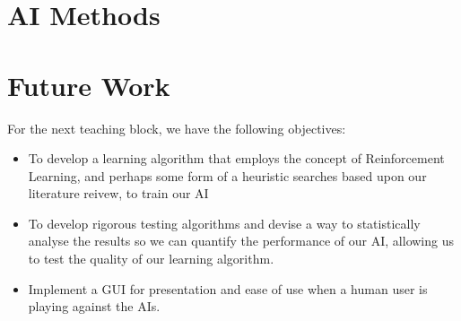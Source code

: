\documentclass{article}
\begin{document}
\begin{multicols*}{2}
\section{AI Methods}


\section{Future Work}
For the next teaching block, we have the following objectives:
\begin{itemize}
    \item To develop a learning algorithm that employs the concept of Reinforcement Learning, and perhaps some form of a heuristic searches based upon our literature reivew, to train our AI
    \item To develop rigorous testing algorithms and devise a way to statistically analyse the results so we can quantify the performance of our AI, allowing us to test the quality of our learning algorithm.
    \item Implement a GUI for presentation and ease of use when a human user is playing against the AIs.
\end{itemize}





\end{multicols*}
\end{document}
